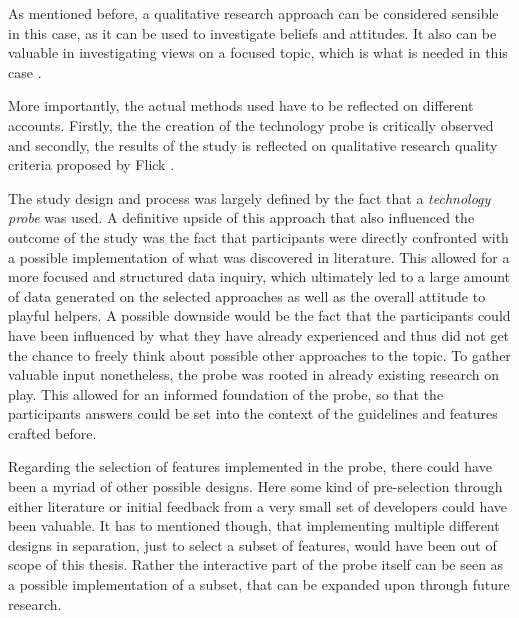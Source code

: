 As mentioned before, a qualitative research approach can be considered sensible in this case, as it can be used to investigate beliefs and attitudes. It also can be valuable in investigating views on a focused topic, which is what is needed in this case \cite{10.1093/humrep/dev334}.

More importantly, the actual methods used have to be reflected on different accounts. Firstly, the the creation of the technology probe is critically observed and secondly, the results of the study is reflected on qualitative research quality criteria proposed by Flick \cite[p. 541-549]{flick2018introduction}.

The study design and process was largely defined by the fact that a \textit{technology probe} was used. A definitive upside of this approach that also influenced the outcome of the study was the fact that participants were directly confronted with a possible implementation of what was discovered in literature. This allowed for a more focused and structured data inquiry, which ultimately led to a large amount of data generated on the selected approaches as well as the overall attitude to playful helpers. A possible downside would be the fact that the participants could have been influenced by what they have already experienced and thus did not get the chance to freely think about possible other approaches to the topic. To gather valuable input nonetheless, the probe was rooted in already existing research on play. This allowed for an informed foundation of the probe, so that the participants answers could be set into the context of the guidelines and features crafted before.

Regarding the selection of features implemented in the probe, there could have been a myriad of other possible designs. Here some kind of pre-selection through either literature or initial feedback from a very small set of developers could have been valuable. It has to mentioned though, that implementing multiple different designs in separation, just to select a subset of features, would have been out of scope of this thesis. Rather the interactive part of the probe itself can be seen as a possible implementation of a subset, that can be expanded upon through future research.

